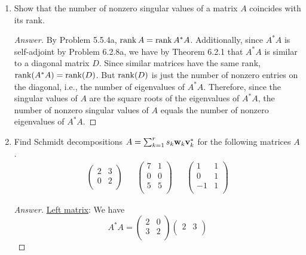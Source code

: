 \documentclass[../psets.tex]{subfiles}
\begin{document}
\begin{enumerate}[label={\textbf{3.\arabic*.}}]
    \item Show that the number of nonzero singular values of a matrix $A$ coincides with its rank.
    \begin{proof}[Answer]
        By Problem 5.5.4a, $\rank A=\rank A^*A$. Additionally, since $A^*A$ is self-adjoint by Problem 6.2.8a, we have by Theorem 6.2.1 that $A^*A$ is similar to a diagonal matrix $D$. Since similar matrices have the same rank, $\rank(A^*A)=\rank(D)$. But $\rank(D)$ is just the number of nonzero entries on the diagonal, i.e., the number of eigenvalues of $A^*A$. Therefore, since the singular values of $A$ are the square roots of the eigenvalues of $A^*A$, the number of nonzero singular values of $A$ equals the number of nonzero eigenvalues of $A^*A$.
    \end{proof}
    \item Find Schmidt decompositions $A=\sum_{k=1}^rs_k\mathbf{w}_k\mathbf{v}_k^*$ for the following matrices $A$.
    \begin{align*}
        \begin{pmatrix}
            2 & 3\\
            0 & 2\\
        \end{pmatrix}&&
        \begin{pmatrix}
            7 & 1\\
            0 & 0\\
            5 & 5\\
        \end{pmatrix}&&
        \begin{pmatrix}
            1 & 1\\
            0 & 1\\
            -1 & 1\\
        \end{pmatrix}
    \end{align*}
    \begin{proof}[Answer]
        \underline{Left matrix}: We have
        \begin{equation*}
            A^*A =
            \begin{pmatrix}
                2 & 0\\
                3 & 2\\
            \end{pmatrix}
            \begin{pmatrix}
                2 & 3\\

\end{pmatrix}
\end{equation*}
\end{proof}
\end{enumerate}
\end{document}
